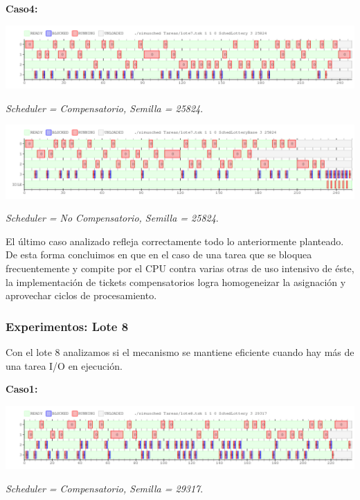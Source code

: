 \vspace{2mm}
\textbf{Caso4:}


\includegraphics[width=1\textwidth]{./Graficos/Ej10v2/Task7/ej9_4.png}
\begin{center}
 \textit{Scheduler = Compensatorio, Semilla = 25824}.
\end{center}


\includegraphics[width=1\textwidth]{./Graficos/Ej10v2/Task7/ej9_4_base.png}
\begin{center}
 \textit{Scheduler = No Compensatorio, Semilla = 25824}.
\end{center}

El \'ultimo caso analizado refleja correctamente todo lo anteriormente planteado. De esta forma concluimos en que en el caso de una tarea que se bloquea frecuentemente y compite por el CPU contra varias otras de uso intensivo de \'este, la implementaci\'on de tickets compensatorios logra homogeneizar la asignaci\'on y aprovechar ciclos de procesamiento.

\subsubsection{Experimentos: Lote 8}

\vspace{2mm}

Con el lote 8 analizamos si el mecanismo se mantiene eficiente cuando hay m\'as de una tarea I/O en ejecuci\'on.

\vspace{2mm}


\textbf{Caso1:}

\vspace{2mm}

\includegraphics[width=1\textwidth]{./Graficos/Ej10v2/Task8/ej9_3.png}
\begin{center}
 \textit{Scheduler = Compensatorio, Semilla = 29317}.
\end{center}



